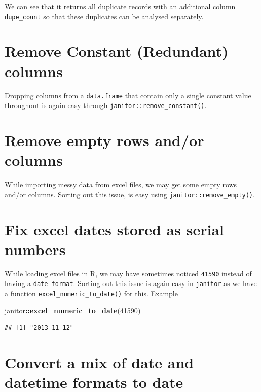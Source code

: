 \documentclass[
]{book}
\newenvironment{Shaded}{\begin{snugshade}}{\end{snugshade}}
\newcommand{\DecValTok}[1]{\textcolor[rgb]{0.00,0.00,0.81}{#1}}
\newcommand{\FunctionTok}[1]{\textcolor[rgb]{0.13,0.29,0.53}{\textbf{#1}}}
\newcommand{\NormalTok}[1]{#1}
\newcommand{\SpecialCharTok}[1]{\textcolor[rgb]{0.81,0.36,0.00}{\textbf{#1}}}
\begin{document}
We can see that it returns all duplicate records with an additional column \texttt{dupe\_count} so that these duplicates can be analysed separately.

\hypertarget{remove-constant-redundant-columns}{%
\section{Remove Constant (Redundant) columns}\label{remove-constant-redundant-columns}}

Dropping columns from a \texttt{data.frame} that contain only a single constant value throughout is again easy through \texttt{janitor::remove\_constant()}.

\hypertarget{remove-empty-rows-andor-columns}{%
\section{Remove empty rows and/or columns}\label{remove-empty-rows-andor-columns}}

While importing messy data from excel files, we may get some empty rows and/or columns. Sorting out this issue, is easy using \texttt{janitor::remove\_empty()}.

\hypertarget{fix-excel-dates-stored-as-serial-numbers}{%
\section{Fix excel dates stored as serial numbers}\label{fix-excel-dates-stored-as-serial-numbers}}

While loading excel files in R, we may have sometimes noticed \texttt{41590} instead of having a \texttt{date\ format}. Sorting out this issue is again easy in \texttt{janitor} as we have a function \texttt{excel\_numeric\_to\_date()} for this. Example

\begin{Shaded}
\begin{Highlighting}[]
\NormalTok{janitor}\SpecialCharTok{::}\FunctionTok{excel\_numeric\_to\_date}\NormalTok{(}\DecValTok{41590}\NormalTok{)}
\end{Highlighting}
\end{Shaded}

\begin{verbatim}
## [1] "2013-11-12"
\end{verbatim}

\hypertarget{convert-a-mix-of-date-and-datetime-formats-to-date}{%
\section{Convert a mix of date and datetime formats to date}\label{convert-a-mix-of-date-and-datetime-formats-to-date}}
\end{document}
